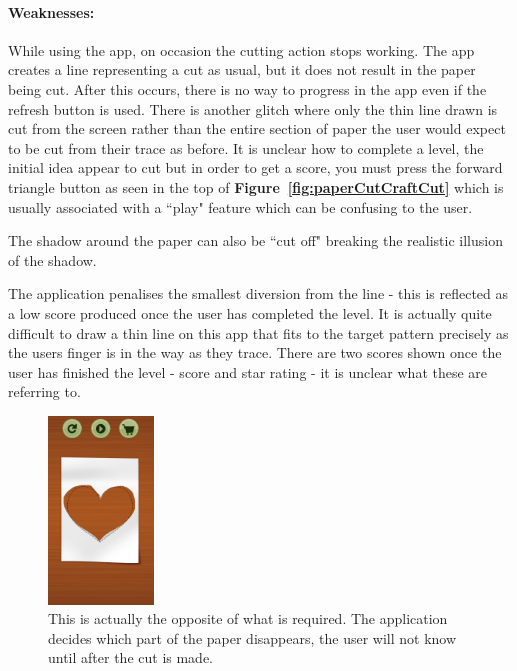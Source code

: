 \documentclass[11pt]{article}
\begin{document}
                \paragraph{Weaknesses:}
                While using the app, on occasion the cutting action stops working. The app creates a line representing a cut as usual, but it does not result in the paper being cut. After this occurs, there is no way to progress in the app even if the refresh button is used. There is another glitch where only the thin line drawn is cut from the screen rather than the entire section of paper the user would expect to be cut from their trace as before. 
                It is unclear how to complete a level, the initial idea appear to cut but in order to get a score, you must press the forward triangle button as seen in the top of \textbf{Figure~\ref{fig:paperCutCraftCut}} which is usually associated with a ``play" feature which can be confusing to the user. 
                
                The shadow around the paper can also be ``cut off" breaking the realistic illusion of the shadow.
                
                The application penalises the smallest diversion from the line - this is reflected as a low score produced once the user has completed the level. It is actually quite difficult to draw a thin line on this app that fits to the target pattern precisely as the users finger is in the way as they trace. There are two scores shown once the user has finished the level - score and star rating - it is unclear what these are referring to. 
                
                 \begin{figure}
                \includegraphics[width=0.25\textwidth]{Images/paperCutCraftReveal.png}
                    \caption{This is actually the opposite of what is required. The application decides which part of the paper disappears, the user will not know until after the cut is made.}
                    \label{fig:paperCutCraftReveal}
                \end{figure}
                
\end{document}
